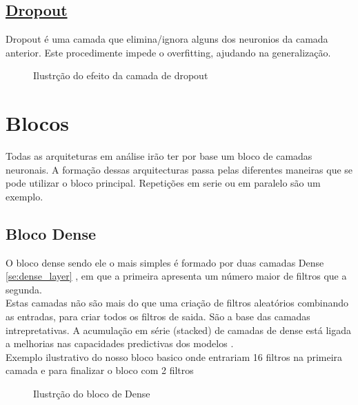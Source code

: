 \subsection{\href{https://keras.io/api/layers/regularization_layers/dropout/}{Dropout}\label{se:dropout}}

Dropout é uma camada que elimina/ignora alguns dos neuronios da camada anterior. Este procedimente impede o overfitting, ajudando na generalização. \\

\begin{figure}[H]
	\centering
	\resizebox{\linewidth}{!}{}
	\caption{Ilustrção do efeito da camada de dropout}
	\label{fig:dropout}
\end{figure}



\section{Blocos\label{se:blocos}}

Todas as arquiteturas em análise irão ter por base um bloco de camadas neuronais. A formação dessas arquitecturas passa pelas diferentes maneiras que se pode utilizar o bloco principal. Repetições em serie ou em paralelo são um exemplo. \\

\subsection{Bloco Dense\label{se:dense}}

O bloco dense sendo ele o mais simples é formado por duas camadas Dense \ref{se:dense_layer} \cite{}, em que a primeira apresenta um número maior de filtros que a segunda. \\
Estas camadas não são mais do que uma criação de filtros aleatórios combinando as entradas, para criar todos os filtros de saida. São a base das camadas intrepretativas. A acumulação em série (stacked) de camadas de dense está ligada a melhorias nas capacidades predictivas dos modelos \cite{VLHelen2021}. \\
Exemplo ilustrativo do nosso bloco basico onde entrariam 16 filtros na primeira camada e para finalizar o bloco com 2 filtros \\




\begin{figure}[H]
	\centering
	\resizebox{\linewidth}{!}{}
	\caption{Ilustrção do bloco de Dense}
	\label{fig:dense_block}
\end{figure}




